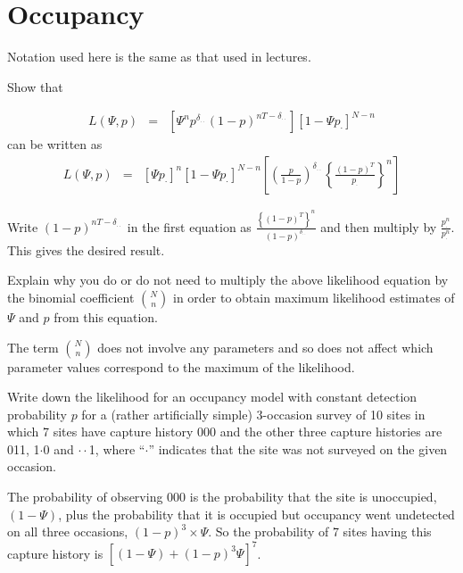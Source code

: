 \chapter{Occupancy\label{sec:occ_ex}}


Notation used here is the same as that used in lectures.

\begin{questions}

\item Show that 

\begin{eqnarray*}
L(\Psi,p)&=&\left[\Psi^n p^{\delta_{\cdot\cdot}}(1-p)^{nT-\delta_{\cdot\cdot}}\right]\left[1-\Psi p_\cdot\right]^{N-n}
\end{eqnarray*}
can be written as
\begin{eqnarray*}
L(\Psi,p)&=&\left[\Psi p_\cdot\right]^n\left[1-\Psi p_\cdot\right]^{N-n}\left[\left(\frac{p}{1-p}\right)^{\delta_{\cdot\cdot}}\left\{\frac{(1-p)^T}{p_\cdot}\right\}^n\right]
\end{eqnarray*}

{\begin{solution}
Write $(1-p)^{nT-\delta_{\cdot\cdot}}$ in the first equation as $\frac{\left\{(1-p)^T\right\}^n}{(1-p)^{\delta_{\cdot\cdot}}}$ and then multiply by $\frac{p_\cdot^n}{p_\cdot^n}$. This gives the desired result.
\end{solution}}

\item Explain why you do or do not need to multiply the above likelihood equation by the binomial coefficient ${N\choose n}$ in order to obtain maximum likelihood estimates of $\Psi$ and $p$ from this equation.

{\begin{solution}
The term $N\choose n$ does not involve any parameters and so does not affect which parameter values correspond to the maximum of the likelihood.
\end{solution}}

\item Write down the likelihood for an occupancy model with constant detection probability $p$ for a (rather artificially simple) 3-occasion survey of 10 sites in which 7 sites have capture history 000 and the other three capture histories are 011, 1$\cdot$0 and $\cdot\cdot$1, where ``$\cdot$'' indicates that the site was not surveyed on the given occasion.

{\begin{solution}
The probability of observing $000$ is the probability that the site is unoccupied, $(1-\Psi)$, plus the probability that it is occupied but occupancy went undetected on all three occasions, $(1-p)^3\times\Psi$. So the probability of 7 sites having this capture history is $\left[(1-\Psi)+(1-p)^3\Psi\right]^7$. 


\end{solution}}
\end{questions}
